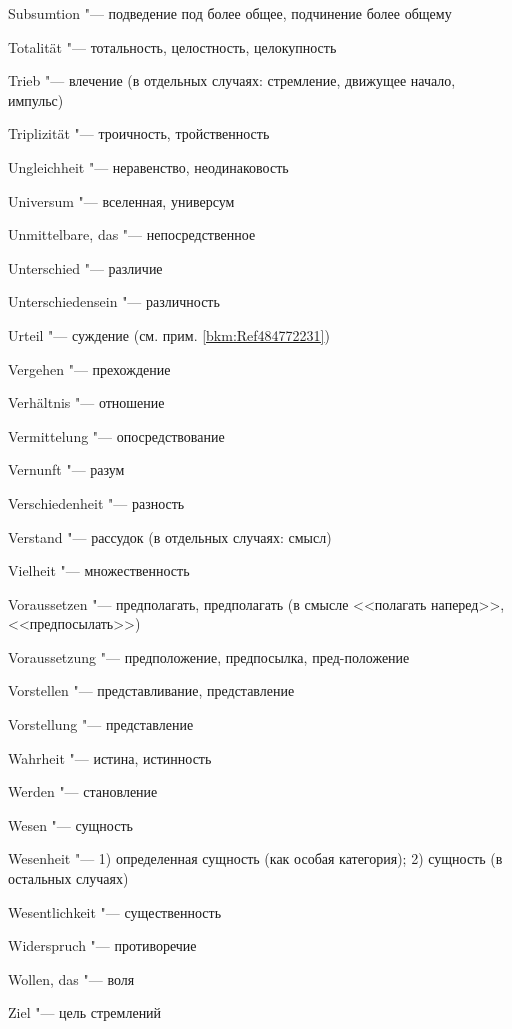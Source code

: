 {{\begin{multicols}{2}
Subsumtion "--- подведение под более общее, подчинение более общему

\bigskip

Totalität "--- тотальность, целостность, целокупность

Trieb "--- влечение (в отдельных случаях: стремление, движущее
начало, импульс)

Triplizität "--- троичность, тройственность

\bigskip

Ungleichheit "--- неравенство, неодинаковость

Universum "--- вселенная, универсум

Unmittelbare, das "--- непосредственное

Unterschied "--- различие

Unterschiedensein "--- различность

Urteil "--- суждение (см. прим. \ref{bkm:Ref484772231})

\bigskip

Vergehen "--- прехождение

Verhältnis "--- отношение

Vermittelung "--- опосредствование

Vernunft "--- разум

Verschiedenheit "--- разность

Verstand "--- рассудок (в отдельных случаях: смысл)

Vielheit "--- множественность

Voraussetzen "--- предполагать, предполагать (в смысле <<полагать
наперед>>, <<предпосылать>>)

Voraussetzung "--- предположение, предпосылка, пред-положение

Vorstellen "--- представливание, представление

Vorstellung "--- представление

\bigskip

Wahrheit "--- истина, истинность

Werden "--- становление

Wesen "--- сущность

Wesenheit "--- 1) определенная сущность (как особая категория);
2) сущность (в остальных случаях)

Wesentlichkeit "--- существенность

Widerspruch "--- противоречие

Wollen, das "--- воля

\bigskip

Ziel "--- цель стремлений


\end{multicols}}}
